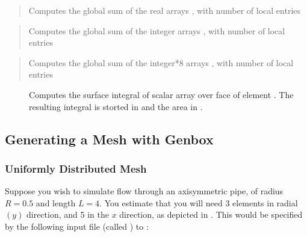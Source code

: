 \documentclass[letterpaper,10pt,english]{sphinxmanual}
\begin{document}



\begin{quote}

Computes the global sum of the real arrays , with number of local entries 
\end{quote}

\begin{quote}

Computes the global sum of the integer arrays , with number of local entries 
\end{quote}

\begin{quote}

Computes the global sum of the integer*8 arrays , with number of local entries 
\end{quote}
\begin{description}
\item[{}] \leavevmode
Computes the surface integral of scalar array  over face  of element .
The resulting integral is storted in  and the area in .

\end{description}


\subsection{Generating a Mesh with Genbox}
\label{\detokenize{appendix:mesh-gen}}\label{\detokenize{appendix:generating-a-mesh-with-genbox}}

\subsubsection{Uniformly Distributed Mesh}
\label{\detokenize{appendix:uniformly-distributed-mesh}}
Suppose you wish to simulate flow through an axisymmetric pipe,
of radius \(R=0.5\) and length \(L=4\).  You estimate that you will
need 3 elements in radial \((y)\) direction, and 5 in the \(x\) direction,
as depicted in .
This would be specified by the following input file (called )
to :
\end{document}

